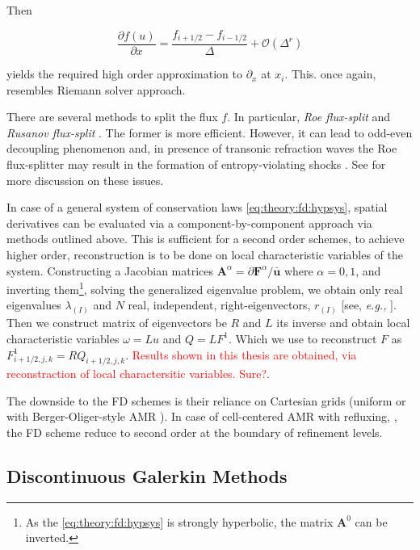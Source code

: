 \documentclass[11pt,a4paper,headinclude=true,DIV=14,BCOR=8mm,chapterprefix,listof=totoc,twoside,openright,abstracton]{scrbook}
\newcommand{\red}[1]{\textcolor{red}{#1}}
\begin{document}
Then

\begin{equation}
\frac{\partial f(u)}{\partial x} = \frac{f_{i+1/2} - f_{i-1/2}}{\Delta} + \mathcal{O}(\Delta^r)
\end{equation}

yields the required high order approximation to $\partial_x$ at $x_i$. This. once again, resembles Riemann solver approach. 

There are several methods to split the flux $f$. In particular, \textit{Roe flux-split} and \textit{Rusanov flux-split} \cite{Shu:1997}. The former is more efficient. However, it can lead to odd-even decoupling phenomenon \cite{Quirk:1994} and, in presence of transonic refraction waves the Roe flux-splitter may result in the formation of entropy-violating shocks \cite{LeVeque:1992}. See \cite{LeVeque:1992,Radice:2012cu} for more discussion on these issues.

In case of a general system of conservation laws \ref{eq:theory:fd:hypsys}, spatial derivatives can be evaluated via a component-by-component approach via methods outlined above. This is sufficient for a second order schemes, to achieve higher order, reconstruction is to be done on local characteristic variables of the system. Constructing a Jacobian matrices $\boldsymbol{A}^{\alpha} = \partial \boldsymbol{F}^{\alpha} / \bar{\boldsymbol{u}}$ where $\alpha = 0,1$, and inverting them\footnote{As the \ref{eq:theory:fd:hypsys} is strongly hyperbolic, the matrix $\boldsymbol{A}^0$ can be inverted.}, solving the generalized eigenvalue problem, we obtain only real eigenvalues $\lambda_{(I)}$ and $N$ real, independent, right-eigenvectors, $r_{(I)}$ [see, \textit{e.g.,} \cite{Anile:1990}]. Then we construct matrix of eigenvectors be $R$ and $L$ its inverse and obtain local characteristic variables $\omega = Lu$ and $Q = LF^1 $. Which we use to reconstruct $F$ as $F^1_{i+1/2, j, k} = RQ_{i+1/2, j, k}$. \red{Results shown in this thesis are obtained, via reconstraction of local charactersitic variables. Sure?}. 

The downside to the FD schemes is their reliance on Cartesian grids (uniform or with Berger-Oliger-style AMR \cite{Berger:1984}). In case of cell-centered AMR with refluxing, \cite{Berger:1989}, the FD scheme reduce to second order at the boundary of refinement levels.


\subsection{Discontinuous Galerkin Methods}
\end{document}
